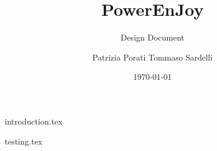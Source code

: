 \documentclass{beamer}
\author{Patrizia Porati \newline Tommaso Sardelli}
\title{PowerEnJoy}
\subtitle{Design Document}
\institute{Politecnico di Milano}
\date{\today}
\begin{document}
{introduction.tex}



{testing.tex}

\end{document}
